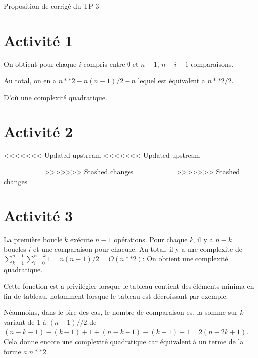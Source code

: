 
	
\begin{Large}
	Proposition de corrigé du TP 3
\end{Large}


\section*{Activité 1}



\eject 



On obtient pour chaque $i$ compris entre 0 et $n-1$, $n-i-1$ comparaisons.

Au total, on en a $n**2-n(n-1)/2-n$ lequel est équivalent a $n**2/2$.

D'où une complexité quadratique.


\eject

\section*{Activité 2}

<<<<<<< Updated upstream
<<<<<<< Updated upstream

\vspace{3.5cm}
=======
\vspace{3.5cm}
>>>>>>> Stashed changes
=======
\vspace{3.5cm}
>>>>>>> Stashed changes

\eject \section*{Activité 3}



La première boucle $k$ ex\'ecute $n-1$ opérations. Pour chaque $k$, il y a $n-k$ boucles $i$ et une comparaison pour chacune. Au total, il y a une complexite de $\displaystyle\sum_{k=1}^{n-1}\sum_{i=0}^{n-k} 1 =n(n-1)/2 = O(n**2)$:
On obtient une complexité quadratique.



Cette fonction est a privilégier lorsque le tableau contient des éléments minima en fin de tableau, notamment lorsque le tableau est décroissant par exemple.

Néanmoins, dans le pire des cas, le nombre de comparaison est la somme sur $k$ variant de 1 à $(n-1)//2$ de $(n-k-1)-(k-1)+1+(n-k-1)-(k-1)+1=2(n-2k+1)$. Cela donne encore une complexité quadratique car équivalent à un terme de la forme $a.n**2$.



